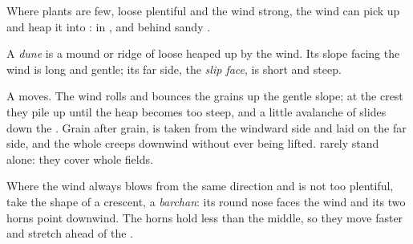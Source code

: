 Where plants are few, loose  plentiful and the wind strong, the wind
can pick up  and heap it into : in , and behind sandy
.

\begin{definition}[Dune]\label{def:g9:landforms:dune}
A \emph{dune} is a mound or ridge of loose  heaped up by
the wind. Its slope facing the wind is long and gentle; its far side, the
\emph{slip face}, is short and steep.
\end{definition}

A  moves. The wind rolls and bounces the grains up the gentle slope;
at the crest they pile up until the heap becomes too steep, and a little
avalanche of  slides down the . Grain after grain,  is
taken from the windward side and laid on the far side, and the whole 
creeps downwind without ever being lifted.  rarely stand alone: they
cover whole fields.

Where the wind always blows from the same direction and  is not too
plentiful,  take the shape of a crescent, a \emph{barchan}: its round
nose faces the wind and its two horns point downwind. The horns hold less
 than the middle, so they move faster and stretch ahead of the .

